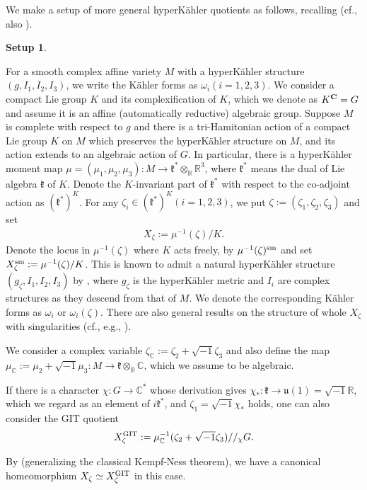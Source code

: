 \documentclass[12pt,a4paper]{amsart}
\theoremstyle{remark}
\theoremstyle{definition}
\newtheorem{Setup}{Setup}
\def\R{\mathbb{R}}
\def\C{\mathbb{C}}
\begin{document}
We make a setup of more general hyperK\"ahler quotients as follows, 
recalling \cite[\S 3]{HKLR} (cf., also \cite{Nakajima, Kir}). 

\begin{Setup}\label{set:HKLR}

For a smooth complex affine variety $M$ with a 
hyperK\"ahler structure $(g,I_1,I_2,I_3)$,  
we write the K\"ahler forms as $\omega_i (i=1,2,3)$. 
We consider a compact Lie group $K$ and 
its complexification of $K$, which we denote 
as $K^{\bf C}=G$ and assume it is an affine 
(automatically reductive) algebraic group. 
Suppose $M$ is complete with respect to $g$ and 
there is a tri-Hamitonian action of a 
compact Lie group $K$ on $M$ which preserves the hyperK\"ahler structure on 
$M$, and its action extends to an algebraic action of 
$G$. In particular, there is a hyperK\"ahler moment map 
$\mu=(\mu_1,\mu_2,\mu_3)\colon M\to \mathfrak{k}^*\otimes_{\R}\R^3$, 
where $\mathfrak{k}^*$ means the dual of Lie algebra $\mathfrak{k}$ 
of $K$. 
Denote the $K$-invariant part of $\mathfrak{k}^*$
with respect to the co-adjoint action as $(\mathfrak{k}^{*})^K$. 
For any 
$\zeta_i\in (\mathfrak{k}^{*})^K (i=1,2,3)$, 
we put $\zeta:=(\zeta_1,\zeta_2,\zeta_3)$ and set 
\begin{align}
X_\zeta:=\mu^{-1}
(\zeta)/K.     
\end{align}
Denote the locus in $\mu^{-1}(\zeta)$ where $K$ acts freely, 
by $\mu^{-1}(\zeta)^{\rm sm}$ and set $X_\zeta^{\rm sm}:=\mu^{-1}
(\zeta)/K$. This is known to admit a natural hyperK\"ahler structure 
$(g_\zeta,I_1,I_2,I_3)$ 
by \cite[\S 3 D]{HKLR}, where $g_\zeta$ is the 
hyperK\"ahler metric 
and $I_i$ are complex structures as they descend from that of $M$. 
We denote the corresponding K\"ahler forms as $\omega_i$ or 
$\omega_i(\zeta)$. 
There are also general results on the structure of 
whole $X_{\zeta}$ with singularities (cf., e.g., \cite{LSj, DancerSwann, May}). 

We consider a complex variable $\zeta_\C:=\zeta_2+\sqrt{-1}\zeta_3$ and 
also define the map $\mu_\C:=\mu_2+\sqrt{-1}\mu_3 
\colon M\to \mathfrak{k}\otimes_{\R} \C$, 
which we assume to be algebraic. 

If there is a 
character $\chi\colon G\to \C^*$ whose derivation 
gives $\chi_*\colon \mathfrak{k}\to \mathfrak{u}(1)=\sqrt{-1}\R$, which we regard as 
an element of $i\mathfrak{k}^*$, and $\zeta_1=\sqrt{-1}\chi_*$ holds, 
one can also consider the GIT quotient 
\begin{align}
X_\zeta^{\rm GIT}:=\mu_\C^{-1}(\zeta_2+\sqrt{-1}\zeta_3)//_{\chi}G. 
\end{align}
\end{Setup}
By \cite[Theorem 1.4 (i)]{May} (generalizing the classical 
Kempf-Ness theorem), we have a canonical homeomorphism 
$X_\zeta \simeq X_\zeta^{\rm GIT}$ in this case. 
\end{document}
